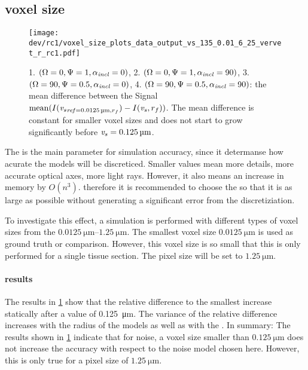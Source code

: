\subsection{voxel size \texorpdfstring{\voxels{}}{}}
% 
% 
\begin{figure}[!tp]%
\centering
\texttt{[image: dev/rc1/voxel\_size\_plots\_data\_output\_vs\_135\_0.01\_6\_25\_vervet\_r\_rc1.pdf]}
\caption[voxel size model with noise]{1. $(\textnormal{$\Omega$}=0, \textnormal{$\Psi$}=1, \textnormal{$\alpha_{\mathit{incl}}$}=0)$, 2. $(\textnormal{$\Omega$}=0, \textnormal{$\Psi$}=1, \textnormal{$\alpha_{\mathit{incl}}$}=90)$, 3. $(\textnormal{$\Omega$}=90, \textnormal{$\Psi$}=0.5, \textnormal{$\alpha_{\mathit{incl}}$}=0)$, 4. $(\textnormal{$\Omega$}=90, \textnormal{$\Psi$}=0.5, \textnormal{$\alpha_{\mathit{incl}}$}=90)$: the mean difference between the Signal $\mean(\intensity(\voxels_{\mathit{ref} = \SI{0.0125}{\micro\meter}, \fiberRadius})- \intensity(\voxels, \fiberRadius))$. The mean difference is constant for smaller voxel sizes and does not start to grow significantly before $\voxels=\SI{0.125}{\micro\meter}$. }
\label{fig:voxelsizeNoise}
\end{figure}
% 
The \voxelsize{} \voxels{} is the main parameter for simulation accuracy, since it determanse how acurate the models will be discreticed.
Smaller values mean more details, more accurate optical axes, more light rays.
However, it also means an increase in memory by $O(n^3)$.
therefore it is recommended to choose the \voxelsize{} so that it is as large as possible without generating a significant error from the discretiziation.
\par
% 
To investigate this effect, a simulation is performed with different types of voxel sizes from the $\SIrange{0.0125}{1.25}{\micro\meter}$.
The smallest voxel size $\SI{0.0125}{\micro\meter}$ is used as ground truth or comparison. 
However, this voxel size is so small that this is only performed for a single tissue section. 
The pixel size \pixelsize{} will be set to $\SI{1.25}{\micro\meter}$. 
% 
\paragraph{results}
The results  in \cref{fig:voxelsizeNoise} show that the relative difference to the smallest \voxelsize{} increase statically after a value of \SI{0.125}{\micro\meter}.
The variance of the relative difference increases with the radius of the models as well as with the \voxelsize{}.
% 
In summary:
The results shown in \cref{fig:voxelsizeNoise} indicate that for noise, a voxel size smaller than $\SI{0.125}{\micro\meter}$ does not increase the accuracy with respect to the noise model chosen here.
However, this is only true for a pixel size of $\SI{1.25}{\micro\meter}$.
% 
% 
% 

